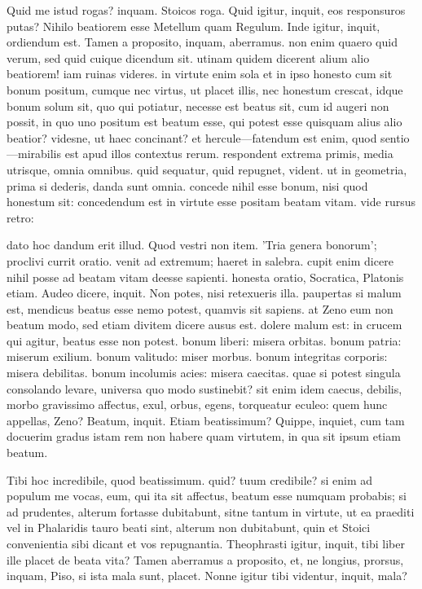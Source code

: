  Quid me istud rogas? inquam. Stoicos roga. Quid igitur, inquit, eos responsuros putas? Nihilo beatiorem esse Metellum quam Regulum. Inde igitur, inquit, ordiendum est. Tamen a proposito, inquam, aberramus. non enim quaero quid verum, sed quid cuique dicendum sit. utinam quidem dicerent alium alio beatiorem! iam ruinas videres. in virtute enim sola et in ipso honesto cum sit bonum positum, cumque nec virtus, ut placet illis, nec honestum crescat, idque bonum solum sit, quo qui potiatur, necesse est beatus sit, cum id augeri non possit, in quo uno positum est beatum esse, qui potest esse quisquam alius alio beatior? videsne, ut haec concinant? et hercule—fatendum est enim, quod sentio—mirabilis est apud illos contextus rerum. respondent extrema primis, media utrisque, omnia omnibus. quid sequatur, quid repugnet, vident. ut in geometria, prima si dederis, danda sunt omnia. concede nihil esse bonum, nisi quod honestum sit: concedendum est in virtute esse positam beatam vitam. vide rursus retro:

 dato hoc dandum erit illud. Quod vestri non item. 'Tria genera bonorum'; proclivi currit oratio. venit ad extremum; haeret in salebra. cupit enim dicere nihil posse ad beatam vitam deesse sapienti. honesta oratio, Socratica, Platonis etiam. Audeo dicere, inquit. Non potes, nisi retexueris illa. paupertas si malum est, mendicus beatus esse nemo potest, quamvis sit sapiens. at Zeno eum non beatum modo, sed etiam divitem dicere ausus est. dolere malum est: in crucem qui agitur, beatus esse non potest. bonum liberi: misera orbitas. bonum patria: miserum exilium. bonum valitudo: miser morbus. bonum integritas corporis: misera debilitas. bonum incolumis acies: misera caecitas. quae si potest singula consolando levare, universa quo modo sustinebit? sit enim idem caecus, debilis, morbo gravissimo affectus, exul, orbus, egens, torqueatur eculeo: quem hunc appellas, Zeno? Beatum, inquit. Etiam beatissimum? Quippe, inquiet, cum tam docuerim gradus istam rem non habere quam virtutem, in qua sit ipsum etiam beatum.

 Tibi hoc incredibile, quod beatissimum. quid? tuum credibile? si enim ad populum me vocas, eum, qui ita sit affectus, beatum esse numquam probabis; si ad prudentes, alterum fortasse dubitabunt, sitne tantum in virtute, ut ea praediti vel in Phalaridis tauro beati sint, alterum non dubitabunt, quin et Stoici convenientia sibi dicant et vos repugnantia. Theophrasti igitur, inquit, tibi liber ille placet de beata vita? Tamen aberramus a proposito, et, ne longius, prorsus, inquam, Piso, si ista mala sunt, placet. Nonne igitur tibi videntur, inquit, mala?

